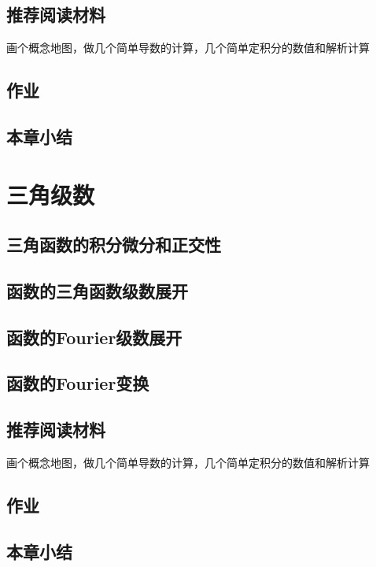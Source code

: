 \documentclass{ctexbook}
\newcommand{\ChapLabel}[1]{\label{#1}}
\begin{document}
\section{推荐阅读材料}
画个概念地图，做几个简单导数的计算，几个简单定积分的数值和解析计算

\section{作业}

\section{本章小结}

\chapter{三角级数}
\ChapLabel{Chap:TrigoExpansion}
\section{三角函数的积分微分和正交性}

\section{函数的三角函数级数展开}

\section{函数的Fourier级数展开}

\section{函数的Fourier变换}

\section{推荐阅读材料}
画个概念地图，做几个简单导数的计算，几个简单定积分的数值和解析计算

\section{作业}

\section{本章小结}
\end{document}
